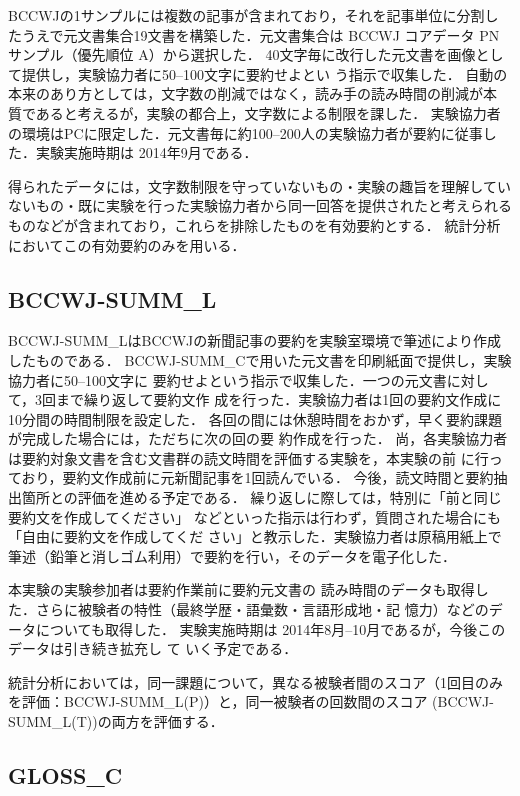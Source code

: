 \documentclass[japanese]{jnlp_1.4}
\newcommand{\modified}[1]{}
\begin{document}
BCCWJの1サンプルには複数の記事が含まれており，それを記事単位に分割したうえで元文書集合19文書を構築した．元文書集合は BCCWJ コアデータ PN サンプル（優先順位 A）から選択した．
40文字毎に改行した元文書を画像として提供し，実験協力者に50--100文字に要約せよとい
う指示で収集した．
自動\modified{要約}の本来のあり方としては，文字数の削減ではなく，読み手の読み時間の削減が本
質であると考えるが，実験の都合上，文字数による制限を課した．
実験協力者の環境はPCに限定した．元文書毎に約100--200人の実験協力者が要約に従事した．実験実施時期は 2014年9月である．

得られたデータには，文字数制限を守っていないもの・実験の趣旨を理解してい
ないもの・既に実験を行った実験協力者から同一回答を提供されたと考えられる
ものなどが含まれており，これらを排除したものを有効要約とする．
統計分析においてこの有効要約のみを用いる．


\subsection{BCCWJ-SUMM\_L}

BCCWJ-SUMM\_LはBCCWJの新聞記事の要約を実験室環境で筆述により作成したもの\cite{asahara-2015-jclws7}である．
BCCWJ-SUMM\_Cで用いた元文書を印刷紙面で提供し，実験協力者に50--100文字に
要約せよという指示で収集した．一つの元文書に対して，3回まで繰り返して要約文作
成を行った．実験協力者は1回の要約文作成に10分間の時間制限を設定した．
各回の間には休憩時間をおかず，早く要約課題が完成した場合には，ただちに次の回の要
約作成を行った．
尚，各実験協力者は要約対象文書を含む文書群の読文時間を評価する実験を，本実験の前
に行っており，要約文作成前に元新聞記事を1回読んでいる．
今後，読文時間と要約抽出箇所との評価を進める予定である．
繰り返しに際しては，特別に「前と同じ要約文を作成してください」
などといった指示は行わず，質問された場合にも「自由に要約文を作成してくだ
さい」と教示した．実験協力者は原稿用紙上で筆述（鉛筆と消しゴム利用）で要約を行い，そのデータを電子化した．

本実験の実験参加者は要約作業前に要約元文書の
読み時間のデータも取得した．さらに被験者の特性（最終学歴・語彙数・言語形成地・記
憶力）などのデータについても取得した．
実験実施時期は 2014年8月--10月であるが，今後このデータは引き続き拡充し
て
いく予定である．

統計分析においては，同一課題について，異なる被験者間のスコア（1回目のみ
を評価：BCCWJ-SUMM\_L(P)）と，同一被験者の回数間のスコア
(BCCWJ-SUMM\_L(T))の両方を評価する．


\subsection{GLOSS\_C}
\end{document}
